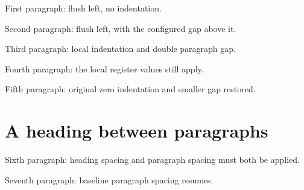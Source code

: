 \documentclass[11pt]{article}
\begin{document}
\pagestyle{empty}
First paragraph: flush left, no indentation.

Second paragraph: flush left, with the configured gap above it.

{\setlength{\parindent}{2em}\setlength{\parskip}{1.3em}
Third paragraph: local indentation and double paragraph gap.\par
Fourth paragraph: the local register values still apply.\par}

Fifth paragraph: original zero indentation and smaller gap restored.
\section*{A heading between paragraphs}
Sixth paragraph: heading spacing and paragraph spacing must both be applied.

Seventh paragraph: baseline paragraph spacing resumes.
\end{document}
